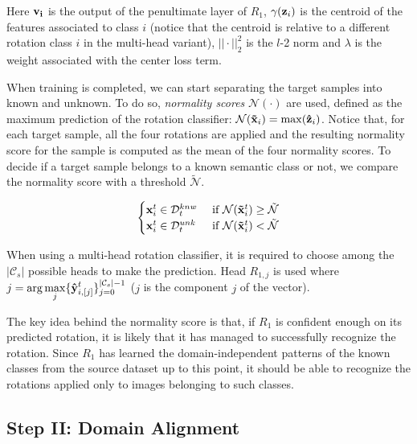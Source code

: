 \documentclass[10pt,twocolumn,letterpaper]{article}
\begin{document}
Here ${\bf v_i}$ is the output of the penultimate layer of $R_1$,
$\gamma({\bf z}_i)$ is the centroid of the features associated to class $i$
(notice that the centroid is relative to a different rotation class $i$ in the multi-head variant),
$||\cdot||_2^2$ is the $l$-2 norm and $\lambda$ is the weight associated with the center loss term.

When training is completed, 
we can start separating the target samples into known and unknown.
To do so,
{\it normality scores} $\mathcal{N}(\cdot)$ are used,
defined as the maximum prediction of the rotation classifier:
$\mathcal{N}({\bf\tilde{x}}_i) = \max({\bf\hat{z}}_i)$.
Notice that, for each target sample, all the four rotations are applied and the resulting normality score for the sample
is computed as the mean of the four normality scores.
To decide if a target sample belongs to a known semantic class or not, we compare the normality score with a threshold $\tilde{\mathcal{N}}$.

\begin{equation}
  \begin{cases}
    {\bf x}_i^t \in \mathcal{D}_t^{knw} & \text{ if } \mathcal{N}({\bf\tilde x}_i^t) \geq \tilde{\mathcal{N}} \\
    {\bf x}_i^t \in \mathcal{D}_t^{unk} & \text{ if } \mathcal{N}({\bf\tilde x}_i^t) < \tilde{\mathcal{N}}
  \end{cases}
  \label{eq:sample_separation}
\end{equation}

When using a multi-head rotation classifier, 
it is required to choose among the $|\mathcal{C}_s|$ possible heads to make the prediction.
Head $R_{1,j}$ is used where $\displaystyle j = \arg\max_j \{{\bf\hat{y}}_{i, [j]}^t\}_{j=0}^{|\mathcal{C}_s|-1}$
($j$ is the component $j$ of the vector).

The key idea behind the normality score is that, if $R_1$ is confident enough on its predicted rotation,
it is likely that it has managed to successfully recognize the rotation.
Since $R_1$ has learned the domain-independent patterns of the known classes from the source dataset up to this point,
it should be able to recognize the rotations applied only to images belonging to such classes.

\subsection{Step II: Domain Alignment}
\label{sec:domain_alignment}
\end{document}
